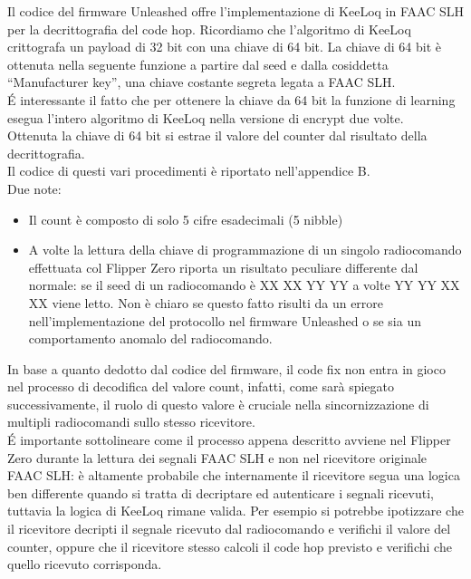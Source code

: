 Il codice del firmware Unleashed offre l’implementazione di KeeLoq in FAAC SLH per la decrittografia del code hop. Ricordiamo che l’algoritmo di KeeLoq crittografa un payload di 32 bit con una chiave di 64 bit. La chiave di 64 bit è ottenuta nella seguente funzione a partire dal seed e dalla cosiddetta “Manufacturer key”, una chiave costante segreta legata a FAAC SLH.\\
É interessante il fatto che per ottenere la chiave da 64 bit la funzione di learning esegua l’intero algoritmo di KeeLoq nella versione di encrypt due volte.\\
Ottenuta la chiave di 64 bit si estrae il valore del counter dal risultato della decrittografia.\\
Il codice di questi vari procedimenti è riportato nell'appendice B.\\
Due note:
\begin{itemize}
  \item Il count è composto di solo 5 cifre esadecimali (5 nibble)
  \item A volte la lettura della chiave di programmazione di un singolo radiocomando effettuata col Flipper Zero riporta un risultato peculiare differente dal normale: se il seed di un radiocomando è XX XX YY YY a volte YY YY XX XX viene letto. Non è chiaro se questo fatto risulti da un errore nell’implementazione del protocollo nel firmware Unleashed o se sia un comportamento anomalo del radiocomando.
\end{itemize}
In base a quanto dedotto dal codice del firmware, il code fix non entra in gioco nel processo di decodifica del valore count, infatti, come sarà spiegato successivamente, il ruolo di questo valore è cruciale nella sincornizzazione di multipli radiocomandi sullo stesso ricevitore.\\
É importante sottolineare come il processo appena descritto avviene nel Flipper Zero durante la lettura dei segnali FAAC SLH e non nel ricevitore originale FAAC SLH: è altamente probabile che internamente il ricevitore segua una logica ben differente quando si tratta di decriptare ed autenticare i segnali ricevuti, tuttavia la logica di KeeLoq rimane valida. Per esempio si potrebbe ipotizzare che il ricevitore decripti il segnale ricevuto dal radiocomando e verifichi il valore del counter, oppure che il ricevitore stesso calcoli il code hop previsto e verifichi che quello ricevuto corrisponda.\\


